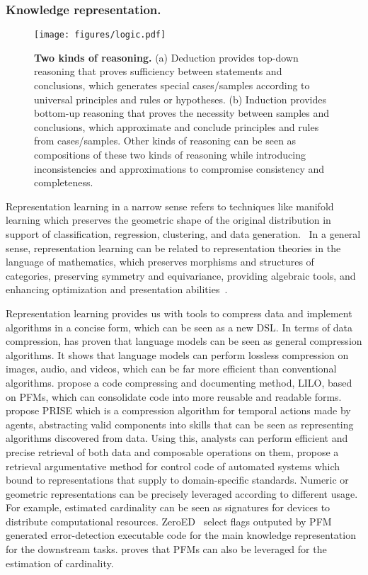   
\subsubsection{Knowledge representation.} \label{sec:representation}
  
\begin{figure*}[h]
    \centering
    \texttt{[image: figures/logic.pdf]} %
    \caption{\textbf{Two kinds of reasoning.} (a) Deduction provides top-down reasoning that proves sufficiency between statements and conclusions, which generates special cases/samples according to universal principles and rules or hypotheses. (b) Induction provides bottom-up reasoning that proves the necessity between samples and conclusions, which approximate and conclude principles and rules from cases/samples. Other kinds of reasoning can be seen as compositions of these two kinds of reasoning while introducing inconsistencies and approximations to compromise consistency and completeness.}
    \label{fig:logic}
\end{figure*}
  
Representation learning in a narrow sense refers to techniques like manifold learning which preserves the geometric shape of the original distribution in support of classification, regression, clustering, and data generation.~\cite{buchholzrobustness, feyposition} In a general sense, representation learning can be related to representation theories in the language of mathematics, which preserves morphisms and structures of categories, preserving symmetry and equivariance, providing algebraic tools, and enhancing optimization and presentation abilities~\cite{yuan2023power, blaauwbroekgraph2tac, HansenCF24}. 
  
Representation learning provides us with tools to compress data and implement algorithms in a concise form, which can be seen as a new DSL. In terms of data compression, \cite{DeletangRDCGMGW24} has proven that language models can be seen as general compression algorithms. It shows that language models can perform lossless compression on images, audio, and videos, which can be far more efficient than conventional algorithms. \cite{GrandWBOLTA24} propose a code compressing and documenting method, LILO, based on PFMs, which can consolidate code into more reusable and readable forms. \cite{zhengprise} propose PRISE which is a compression algorithm for temporal actions made by agents, abstracting valid components into skills that can be seen as representing algorithms discovered from data. Using this, analysts can perform efficient and precise retrieval of both data and composable operations on them, \cite{KoziolekGHALE24} propose a retrieval argumentative method for control code of automated systems which bound to representations that supply to domain-specific standards. Numeric or geometric representations can be precisely leveraged according to different usage. For example, estimated cardinality can be seen as signatures for devices to distribute computational resources. ZeroED~\cite{ZeroED} select flags outputed by PFM generated error-detection executable code for the main knowledge representation for the downstream tasks. \cite{FMcard} proves that PFMs can also be leveraged for the estimation of cardinality.
  
